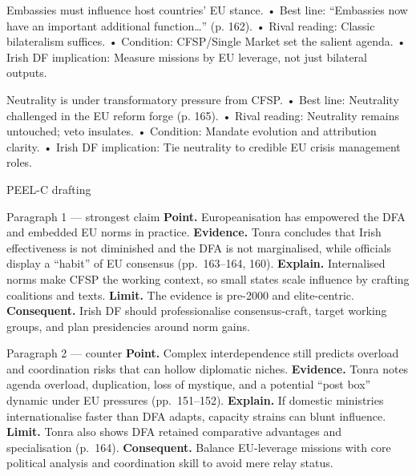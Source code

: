 Embassies must influence host countries’ EU stance.
• Best line: “Embassies now have an important additional function…” (p. 162).
• Rival reading: Classic bilateralism suffices.
• Condition: CFSP/Single Market set the salient agenda.
• Irish DF implication: Measure missions by EU leverage, not just bilateral outputs.

Neutrality is under transformatory pressure from CFSP.
• Best line: Neutrality challenged in the EU reform forge (p. 165).
• Rival reading: Neutrality remains untouched; veto insulates.
• Condition: Mandate evolution and attribution clarity.
• Irish DF implication: Tie neutrality to credible EU crisis management roles.

PEEL-C drafting

Paragraph 1 — strongest claim
\textbf{Point.} Europeanisation has empowered the DFA and embedded EU norms in practice. \textbf{Evidence.} Tonra concludes that Irish effectiveness is not diminished and the DFA is not marginalised, while officials display a “habit” of EU consensus (pp.~163–164, 160). \textbf{Explain.} Internalised norms make CFSP the working context, so small states scale influence by crafting coalitions and texts. \textbf{Limit.} The evidence is pre-2000 and elite-centric. \textbf{Consequent.} Irish DF should professionalise consensus-craft, target working groups, and plan presidencies around norm gains.

Paragraph 2 — counter
\textbf{Point.} Complex interdependence still predicts overload and coordination risks that can hollow diplomatic niches. \textbf{Evidence.} Tonra notes agenda overload, duplication, loss of mystique, and a potential “post box” dynamic under EU pressures (pp.~151–152). \textbf{Explain.} If domestic ministries internationalise faster than DFA adapts, capacity strains can blunt influence. \textbf{Limit.} Tonra also shows DFA retained comparative advantages and specialisation (p.~164). \textbf{Consequent.} Balance EU-leverage missions with core political analysis and coordination skill to avoid mere relay status.


